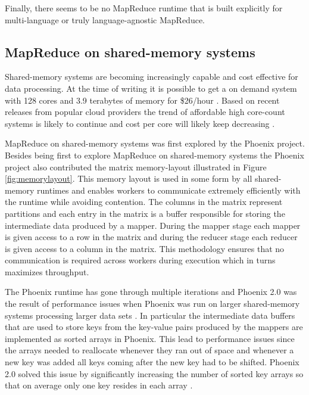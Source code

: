 \documentclass[11pt]{article}       %
\begin{document}
Finally, there seems to be no MapReduce runtime that is built explicitly for
multi-language or truly language-agnostic MapReduce.

\subsection{MapReduce on shared-memory systems}

Shared-memory systems are becoming increasingly capable and cost effective for
data processing. At the time of writing it is possible to get a on demand system
with 128 cores and 3.9 terabytes of memory for \$26/hour \cite{AWS}. Based on
recent releases from popular cloud providers the trend of affordable high
core-count systems is likely to continue and cost per core will likely keep
decreasing \cite{AWS} \cite{GoogleCloud}.



MapReduce on shared-memory systems was first explored by the Phoenix
\cite{Phoenix} project. Besides being first to explore MapReduce on
shared-memory systems the Phoenix project also contributed the matrix
memory-layout illustrated in Figure \ref{fig:memorylayout}. This memory layout
is used in some form by all shared-memory runtimes \cite{Phoenix}
\cite{Phoenix++} \cite{CilkMR} \cite{Metis} \cite{Ostrich} and enables workers
to communicate extremely efficiently with the runtime while avoiding contention.
The columns in the matrix represent partitions and each entry in the matrix is a
buffer responsible for storing the intermediate data produced by a mapper.
During the mapper stage each mapper is given access to a row in the matrix and
during the reducer stage each reducer is given access to a column in the matrix.
This methodology ensures that no communication is required across workers during
execution which in turns maximizes throughput.

The Phoenix runtime has gone through multiple iterations and Phoenix 2.0 was the
result of performance issues when Phoenix was run on larger shared-memory
systems processing larger data sets \cite{Phoenix2}. In particular the
intermediate data buffers that are used to store keys from the key-value pairs
produced by the mappers are implemented as sorted arrays in Phoenix. This lead
to performance issues since the arrays needed to reallocate whenever they ran
out of space and whenever a new key was added all keys coming after the new key
had to be shifted. Phoenix 2.0 solved this issue by significantly increasing the
number of sorted key arrays so that on average only one key resides in each
array \cite{Phoenix2}.
\end{document}
